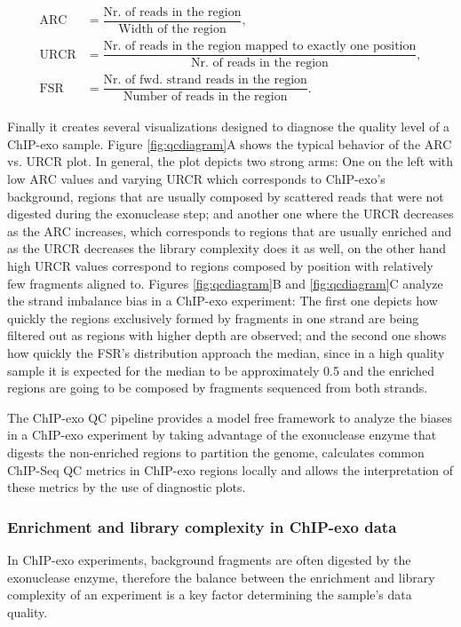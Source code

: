 \documentclass{bmcart}\usepackage[]{graphicx}\usepackage[]{color}
\begin{document}
\begin{align*}
  \text{ARC} &= \dfrac{\text{Nr. of reads in the region}}{\text{Width of the region}}, \\
  \text{URCR} &= \dfrac{\text{Nr. of reads in the region mapped to
      exactly one position}}{\text{Nr. of reads in the region}}, \\
  \text{FSR} &= \dfrac{\text{Nr. of fwd. strand reads in the
      region}}{\text{Number of reads in the region}}.
\end{align*}

Finally it creates several visualizations designed to diagnose the
quality level of a ChIP-exo sample. Figure \ref{fig:qcdiagram}A shows
the typical behavior of the ARC vs. URCR plot. In general, the plot
depicts two strong arms: One on the left with low ARC values and
varying URCR which corresponds to ChIP-exo's background, regions that
are usually composed by scattered reads that were not digested during
the exonuclease step; and another one where the URCR decreases as the
ARC increases, which corresponds to regions that are usually enriched
and as the URCR decreases the library complexity does it as well, on
the other hand high URCR values correspond to regions composed by
position with relatively few fragments aligned to. Figures
\ref{fig:qcdiagram}B and \ref{fig:qcdiagram}C analyze the strand
imbalance bias in a ChIP-exo experiment: The first one depicts how
quickly the regions exclusively formed by fragments in one strand are
being filtered out as regions with higher depth are observed; and the
second one shows how quickly the FSR's distribution approach the
median, since in a high quality sample it is expected for the median
to be approximately 0.5 and the enriched regions are going to be
composed by fragments sequenced from both strands.

The ChIP-exo QC pipeline provides a model free framework to analyze
the biases in a ChIP-exo experiment by taking advantage of the
exonuclease enzyme that digests the non-enriched regions to partition
the genome, calculates common ChIP-Seq QC metrics in ChIP-exo regions
locally and allows the interpretation of these metrics by the use of
diagnostic plots.

\subsubsection{Enrichment and library complexity in ChIP-exo data}

In ChIP-exo experiments, background fragments are often digested by
the exonuclease enzyme, therefore the balance between the enrichment
and library complexity of an experiment is a key factor determining
the sample's data quality.
\end{document}
